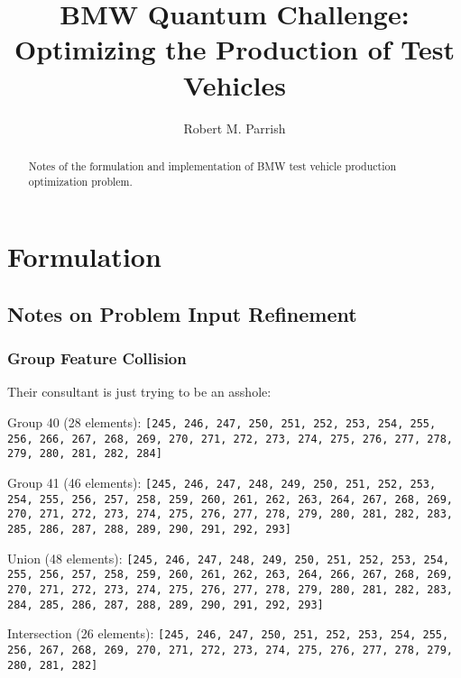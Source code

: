 \documentclass[aps,prl,twocolumn,superscriptaddress,groupedaddress]{revtex4}  %
\begin{document}

\title{
BMW Quantum Challenge: Optimizing the Production of Test Vehicles
}

\author{Robert M. Parrish}


\begin{abstract} 
Notes of the formulation and implementation of BMW test vehicle production
optimization problem.
\end{abstract}

\maketitle

\section{Formulation}


\subsection{Notes on Problem Input Refinement}

\subsubsection{Group Feature Collision}

Their consultant is just trying to be an asshole:

Group 40 (28 elements): \texttt{[245, 246, 247, 250, 251, 252, 253, 254, 255,
256, 266, 267, 268, 269, 270, 271, 272, 273, 274, 275, 276, 277, 278, 279, 280,
281, 282, 284]}

Group 41 (46 elements): \texttt{[245, 246, 247, 248, 249, 250, 251, 252, 253,
254, 255, 256, 257, 258, 259, 260, 261, 262, 263, 264, 267, 268, 269, 270, 271,
272, 273, 274, 275, 276, 277, 278, 279, 280, 281, 282, 283, 285, 286, 287, 288,
289, 290, 291, 292, 293]}

Union (48 elements): \texttt{[245, 246, 247, 248, 249, 250, 251, 252, 253, 254,
255, 256, 257, 258, 259, 260, 261, 262, 263, 264, 266, 267, 268, 269, 270, 271,
272, 273, 274, 275, 276, 277, 278, 279, 280, 281, 282, 283, 284, 285, 286, 287,
288, 289, 290, 291, 292, 293]}

Intersection (26 elements): \texttt{[245, 246, 247, 250, 251, 252, 253, 254,
255, 256, 267, 268, 269, 270, 271, 272, 273, 274, 275, 276, 277, 278, 279, 280,
281, 282]}
\end{document}
